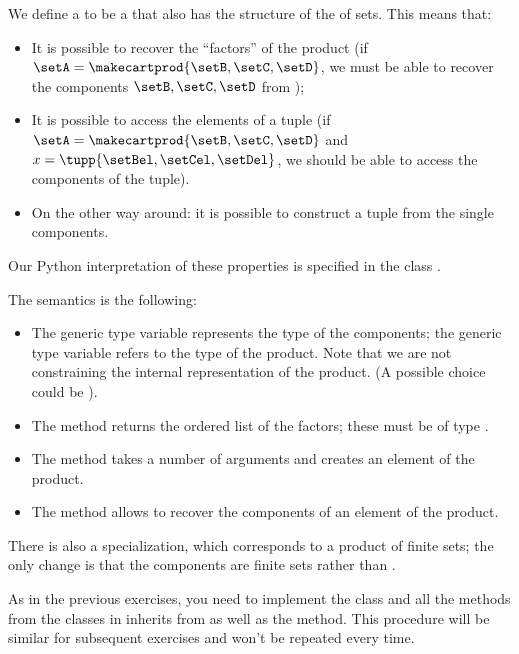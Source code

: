 
We define a  to be a \Setoid that also has the structure of the  of sets.
This means that:
\begin{itemize}
    \item It is possible to recover the ``factors'' of the product (if $\setA = \makecartprod{\setB, \setC, \setD}$, we must be able to recover the components $\setB, \setC, \setD$ from \setA);
    \item It is possible to access the elements of a tuple (if $\setA = \makecartprod{\setB, \setC, \setD}$ and $x = \tupp{\setBel, \setCel, \setDel}$, we should be able to access the components of the tuple).
    \item On the other way around: it is possible to construct a tuple from the single components.
\end{itemize}
Our Python interpretation of these properties is specified in the class .


The semantics is the following:
\begin{itemize}
    \item The generic type variable  represents the type of the components; the generic type variable  refers to the type of the product.
          Note that we are not constraining the internal representation of the product.
          (A possible choice could be ).
    \item The method  returns the ordered list of the  factors; these must be  of type .
    \item The method  takes a number of arguments and creates an element of the product.
    \item The method  allows to recover the components of an element of the product.
\end{itemize}

There is also a specialization, which corresponds to a product of finite sets; the only change is that the components are finite sets rather than .



As in the previous exercises, you need to implement the class  and all the methods from the classes in inherits from as well as the  method.
This procedure will be similar for subsequent exercises and won't be repeated every time.

